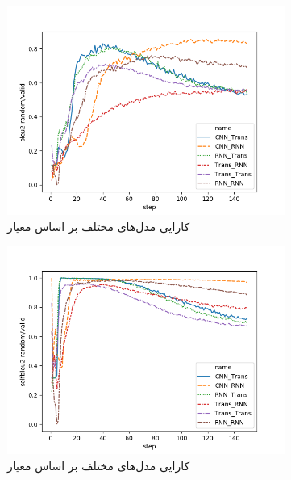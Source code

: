 \begin{figure}[h]
	\centering
	\begin{subfigure}{0.3\textheight}
		\centering
		\includegraphics[width=1.\textwidth]{images/figs/bleu2-random.png}
		\caption{کارایی مدل‌های مختلف بر اساس معیار \bleu[-2]{}}
		\label{fig:chap4:archs_bleu}
	\end{subfigure}
	\begin{subfigure}{0.3\textheight}
		\centering
		\includegraphics[width=1.\textwidth]{images/figs/selfbleu2-random.png}
		\caption{کارایی مدل‌های مختلف بر اساس معیار \selfbleu[-2]{}}
		\label{fig:chap4:archs_selfbleu}
	\end{subfigure}
	\begin{subfigure}{0.3\textheight}

\end{subfigure}
\end{figure}
